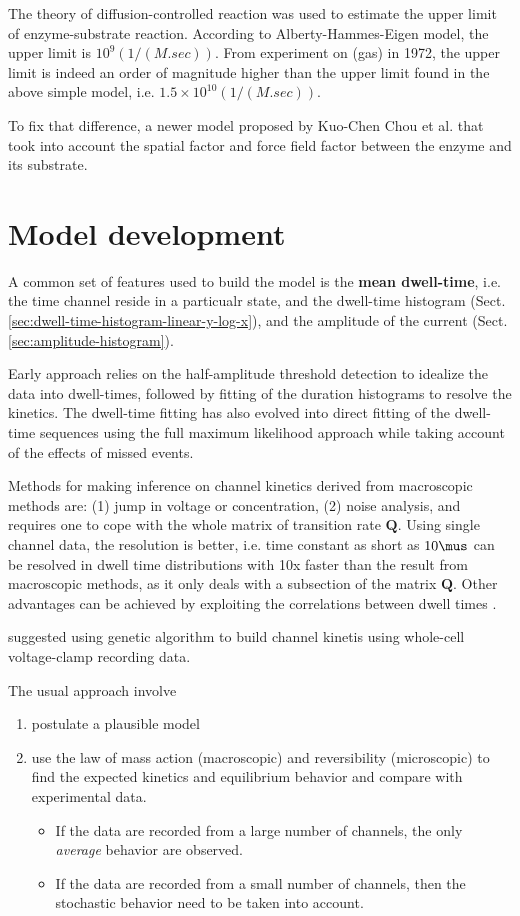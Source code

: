 The theory of diffusion-controlled reaction was used to  estimate the upper
limit of enzyme-substrate reaction. According to Alberty-Hammes-Eigen model, the
upper limit is $10^9 (1/(M.sec))$.
From experiment on  (gas) in 1972, the upper limit is indeed an order
of magnitude higher than the upper limit found in the above simple model, i.e.
$1.5 \times 10^{10} (1/(M.sec))$.

To fix that difference, a newer model proposed by Kuo-Chen Chou et al.
that took into account the spatial factor and force field factor between the
enzyme and its substrate.



\section{Model development}
\label{sec:data-fitting}

A common set of features used to build the model is the {\bf mean dwell-time},
i.e. the time channel reside in a particualr state, and the dwell-time histogram
(Sect.\ref{sec:dwell-time-histogram-linear-y-log-x}), and the amplitude of the
current (Sect.\ref{sec:amplitude-histogram}).

Early approach relies on the half-amplitude threshold detection to idealize the
data into dwell-times, followed by fitting of the duration histograms to resolve
the kinetics. The dwell-time fitting has also evolved into direct fitting of the
dwell-time sequences using the full maximum likelihood approach while taking
account of the effects of missed events.

Methods for making inference on channel kinetics derived from macroscopic
methods are: (1) jump in voltage or concentration, (2) noise analysis, and
requires one to cope with the whole matrix of transition rate $\mathbf{Q}$.
Using single channel data, the resolution is better, i.e. time constant as short as
$10\mus$ can be resolved in dwell time distributions with 10x faster than the
result from macroscopic methods, as it only deals with a subsection of the
matrix $\mathbf{Q}$. Other advantages can be achieved by exploiting the
correlations between dwell times \citep{colquhoun1995qm}.


\citep{gurkiewicz2007} suggested using genetic algorithm to build channel
kinetis using whole-cell voltage-clamp recording data.

The usual approach involve
\begin{enumerate}
\item postulate a plausible model
\item use the law of mass action (macroscopic) and reversibility
  (microscopic) to find the expected kinetics and equilibrium behavior
  and compare with experimental data.
  \begin{itemize}
  \item If the data are recorded from a large number of channels, the
    only {\it average} behavior are observed.
  \item If the data are recorded from a small number of channels, then
    the stochastic behavior need to be taken into account.
  \end{itemize}
\end{enumerate}

